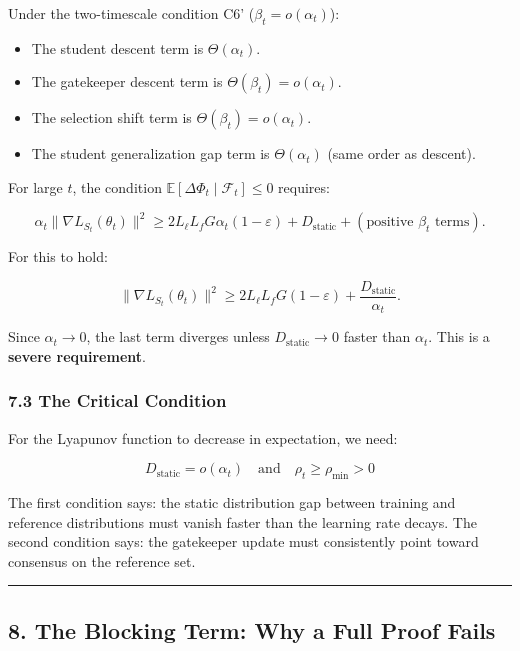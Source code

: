 \documentclass[
  12pt,
]{ctexart}
\providecommand{\tightlist}{%
  \setlength{\itemsep}{0pt}\setlength{\parskip}{0pt}}
\begin{document}
Under the two-timescale condition C6' (\(\beta_t = o(\alpha_t)\)):

\begin{itemize}
\tightlist
\item
  The student descent term is \(\Theta(\alpha_t)\).
\item
  The gatekeeper descent term is \(\Theta(\beta_t) = o(\alpha_t)\).
\item
  The selection shift term is \(\Theta(\beta_t) = o(\alpha_t)\).
\item
  The student generalization gap term is \(\Theta(\alpha_t)\) (same
  order as descent).
\end{itemize}

For large \(t\), the condition
\(\mathbb{E}[\Delta\Phi_t \mid \mathcal{F}_t] \leq 0\) requires:

\[\alpha_t \|\nabla L_{S_t}(\theta_t)\|^2 \geq 2 L_\ell L_f G \alpha_t (1-\varepsilon) + D_{\text{static}} + (\text{positive } \beta_t \text{ terms}).\]

For this to hold:

\[\|\nabla L_{S_t}(\theta_t)\|^2 \geq 2 L_\ell L_f G (1-\varepsilon) + \frac{D_{\text{static}}}{\alpha_t}.\]

Since \(\alpha_t \to 0\), the last term diverges unless
\(D_{\text{static}} \to 0\) faster than \(\alpha_t\). This is a
\textbf{severe requirement}.

\subsubsection{7.3 The Critical Condition}\label{the-critical-condition}

For the Lyapunov function to decrease in expectation, we need:

\[\boxed{\;D_{\text{static}} = o(\alpha_t) \quad \text{and} \quad \rho_t \geq \rho_{\min} > 0\;}\]

The first condition says: the static distribution gap between training
and reference distributions must vanish faster than the learning rate
decays. The second condition says: the gatekeeper update must
consistently point toward consensus on the reference set.

\begin{center}\rule{0.5\linewidth}{0.5pt}\end{center}

\subsection{8. The Blocking Term: Why a Full Proof
Fails}\label{the-blocking-term-why-a-full-proof-fails}
\end{document}
